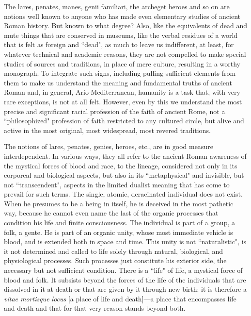 The lares, penates, manes, genii familiari, the archeget heroes and so on are notions well known to anyone who has made even elementary studies of ancient Roman history. But known to what degree? Also, like the equivalents of dead and mute things that are conserved in museums, like the verbal residues of a world that is felt as foreign and ``dead", as much to leave us indifferent, at least, for whatever technical and academic reasons, they are not compelled to make special studies of sources and traditions, in place of mere culture, resulting in a worthy monograph. To integrate such signs, including pulling sufficient elements from them to make us understand the meaning and fundamental truths of ancient Roman and, in general, Ario-Mediter\-ranean, humanity is a task that, with very rare exceptions, is not at all felt. However, even by this we understand the most precise and significant racial profession of the faith of ancient Rome, not a ``philosophized" profession of faith restricted to any cultured circle, but alive and active in the most original, most widespread, most revered traditions.

The notions of lares, penates, genies, heroes, etc., are in good measure interdependent. In various ways, they all refer to the ancient Roman awareness of the mystical forces of blood and race, to the lineage, considered not only in its corporeal and biological aspects, but also in its ``metaphysical" and invisible, but not ``transcendent", aspects in the limited dualist meaning that has come to prevail for such terms. The single, atomic, deracinated individual does not exist. When he presumes to be a being in itself, he is deceived in the most pathetic way, because he cannot even name the last of the organic processes that condition his life and finite consciousness. The individual is part of a group, a folk, a gente. He is part of an organic unity, whose most immediate vehicle is blood, and is extended both in space and time. This unity is not ``naturalistic", is it not determined and called to life solely through natural, biological, and physiological processes. Such processes just constitute his exterior side, the necessary but not sufficient condition. There is a ``life" of life, a mystical force of blood and folk. It subsists beyond the forces of the life of the individuals that are dissolved in it at death or that are given by it through new birth: it is therefore a \emph{vitae mortisque locus} [a place of life and death]—a place that encompasses life and death and that for that very reason stands beyond both.


